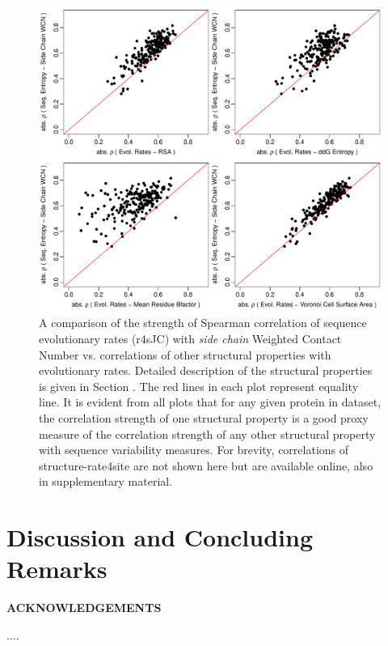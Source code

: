 \documentclass[11pt]{article}
\def\Acknowledgements{\bigskip  \bigskip \begin{center} \begin{large}
             \bf ACKNOWLEDGEMENTS \end{large}\end{center}}
\begin{document}
    \begin{figure}[tbh]
        \begin{center}
        \includegraphics[width=6.9in]{cordiv_similarities_r4sJC.pdf} %
        \end{center}
        \caption{A comparison of the strength of Spearman correlation of sequence evolutionary rates (r4sJC) with {\it side chain} Weighted Contact Number vs. correlations of other structural properties with evolutionary rates. Detailed description of the structural properties is given in Section \label{sec:mam}. The red lines in each plot represent equality line. It is evident from all plots that for any given protein in dataset, the correlation strength of one structural property is a good proxy measure of the correlation strength of any other structural property with sequence variability measures. For brevity, correlations of structure-rate4site are not shown here but are available online, also in supplementary material.}
        \label{fig:seqent_structure_cors}
    \end{figure}
    
    
    
\section{Discussion and Concluding Remarks}
\label{sec:dcr}

\Acknowledgements

....



\end{document}
